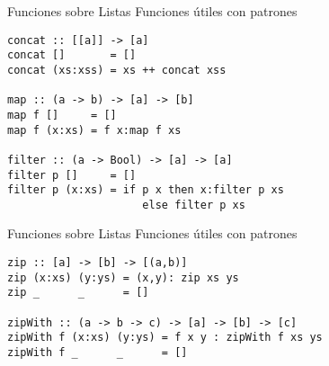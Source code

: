 
\begin{frame}[fragile]{Funciones sobre Listas}
    Funciones útiles con patrones
    \begin{lstlisting}[style=consola]
concat :: [[a]] -> [a]
concat []       = []
concat (xs:xss) = xs ++ concat xss

map :: (a -> b) -> [a] -> [b]
map f []     = []
map f (x:xs) = f x:map f xs

filter :: (a -> Bool) -> [a] -> [a]
filter p []     = []
filter p (x:xs) = if p x then x:filter p xs
                     else filter p xs
    \end{lstlisting}
\end{frame}

\begin{frame}[fragile]{Funciones sobre Listas}
    Funciones útiles con patrones
    \begin{lstlisting}[style=consola]
zip :: [a] -> [b] -> [(a,b)]
zip (x:xs) (y:ys) = (x,y): zip xs ys
zip _      _      = []

zipWith :: (a -> b -> c) -> [a] -> [b] -> [c]
zipWith f (x:xs) (y:ys) = f x y : zipWith f xs ys
zipWith f _      _      = []
    \end{lstlisting}
\end{frame}

